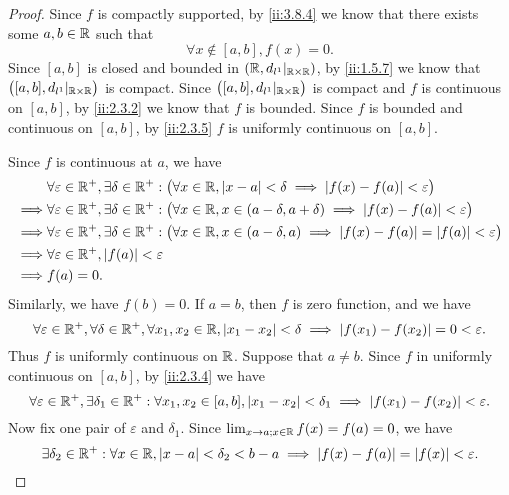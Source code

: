 \begin{proof}
  Since \(f\) is compactly supported, by \cref{ii:3.8.4} we know that there exists some \(a, b \in \mathbb{R}\) such that
  \[
    \forall x \notin [a, b], f(x) = 0.
  \]
  Since \([a, b]\) is closed and bounded in \((\mathbb{R}, d_{l^1}|_{\mathbb{R} \times \mathbb{R}})\), by \cref{ii:1.5.7} we know that \(\big([a, b], d_{l^1}|_{\mathbb{R} \times \mathbb{R}}\big)\) is compact.
  Since \(\big([a, b], d_{l^1}|_{\mathbb{R} \times \mathbb{R}}\big)\) is compact and \(f\) is continuous on \([a, b]\), by \cref{ii:2.3.2} we know that \(f\) is bounded.
  Since \(f\) is bounded and continuous on \([a, b]\), by \cref{ii:2.3.5} \(f\) is uniformly continuous on \([a, b]\).

  Since \(f\) is continuous at \(a\), we have
  \begin{align*}
             & \forall \varepsilon \in \mathbb{R}^+, \exists \delta \in \mathbb{R}^+ : \big(\forall x \in \mathbb{R}, \left\lvert x - a\right\rvert < \delta \implies \left\lvert f(x) - f(a)\right\rvert < \varepsilon\big)               \\
    \implies & \forall \varepsilon \in \mathbb{R}^+, \exists \delta \in \mathbb{R}^+ : \big(\forall x \in \mathbb{R}, x \in (a - \delta, a + \delta) \implies \left\lvert f(x) - f(a)\right\rvert < \varepsilon\big)     \\
    \implies & \forall \varepsilon \in \mathbb{R}^+, \exists \delta \in \mathbb{R}^+ : \big(\forall x \in \mathbb{R}, x \in (a - \delta, a) \implies \left\lvert f(x) - f(a)\right\rvert = \left\lvert f(a)\right\rvert < \varepsilon\big) \\
    \implies & \forall \varepsilon \in \mathbb{R}^+, \left\lvert f(a)\right\rvert < \varepsilon                                                                                                          \\
    \implies & f(a) = 0.
  \end{align*}
  Similarly, we have \(f(b) = 0\).
  If \(a = b\), then \(f\) is zero function, and we have
  \[
    \forall \varepsilon \in \mathbb{R}^+, \forall \delta \in \mathbb{R}^+, \forall x_1, x_2 \in \mathbb{R}, \left\lvert x_1 - x_2\right\rvert < \delta \implies \left\lvert f(x_1) - f(x_2)\right\rvert = 0 < \varepsilon.
  \]
  Thus \(f\) is uniformly continuous on \(\mathbb{R}\).
  Suppose that \(a \neq b\).
  Since \(f\) in uniformly continuous on \([a, b]\), by \cref{ii:2.3.4} we have
  \[
    \forall \varepsilon \in \mathbb{R}^+, \exists \delta_1 \in \mathbb{R}^+ : \forall x_1, x_2 \in [a, b], \left\lvert x_1 - x_2\right\rvert < \delta_1 \implies \left\lvert f(x_1) - f(x_2)\right\rvert < \varepsilon.
  \]
  Now fix one pair of \(\varepsilon\) and \(\delta_1\).
  Since \(\lim_{x \to a ; x \in \mathbb{R}} f(x) = f(a) = 0\), we have
  \[
    \exists \delta_2 \in \mathbb{R}^+ : \forall x \in \mathbb{R}, \left\lvert x - a\right\rvert < \delta_2 < b - a \implies \left\lvert f(x) - f(a)\right\rvert = \left\lvert f(x)\right\rvert < \varepsilon.
\]
\end{proof}
